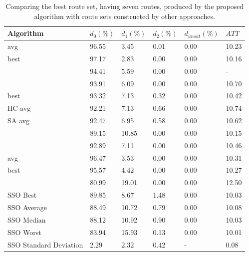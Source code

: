     \begin{table}[H]
    \centering
    \begin{tabular}{|l||l|l|l|l|l|}
    \hline
    Algorithm & $d_0(\%)$ & $d_1(\%)$ & $d_2(\%)$ & $d_{unsat}(\%)$ & $ATT$ \\
    \hline
    \citet{kechagiopoulos14} avg & 96.55 & 3.45 & 0.01 & 0.00 & 10.23 \\
    \citet{kechagiopoulos14} best & 97.17 & 2.83 & 0.00 & 0.00 & 10.16 \\
    \citet{nikolic14} & 94.41 & 5.59 & 0.00 & 0.00 & - \\
    \citet{kidwai98} & 93.91 & 6.09 & 0.00 & 0.00 & 10.70 \\
    \citet{fan10} best & 93.32 & 7.13 & 0.32 & 0.00 & 10.42  \\
    \citet{fan10} HC avg & 92.21 & 7.13 & 0.66 & 0.00 & 10.74 \\
    \citet{fan10} SA avg & 92.47 & 6.95 & 0.58 & 0.00 & 10.62 \\
    \citet{chakroborty02} & 89.15 & 10.85 & 0.00 & 0.00 & 10.15 \\
    \citet{zhang10} & 92.89 & 7.11 & 0.00 & 0.00 & 10.46 \\
    \citet{chew12} avg & 96.47 & 3.53 & 0.00 & 0.00 & 10.31 \\
    \citet{chew12} best & 95.57 & 4.42 & 0.00 & 0.00 & 10.27 \\
    \citet{baaj91} & 80.99 & 19.01 & 0.00 & 0.00 & 12.50 \\
    \hline
    \hline
    SSO Best & 89.85 & 8.67 & 1.48 & 0.00 & 10.03\\
    SSO Average & 88.49 & 10.72 & 0.79 & 0.00 & 10.08\\
    SSO Median & 88.12 & 10.92 & 0.90 & 0.00 & 10.03\\
    SSO Worst & 83.94 & 15.93 & 0.13 & 0.00 & 10.01\\
    SSO Standard Deviation & 2.29 & 2.32 & 0.42 & - & 0.08\\
    \hline
    \end{tabular}
    \caption {Comparing the best route set, having seven routes, produced by the proposed algorithm with route sets constructed by other approaches.}
    \label{table:performanceComparison_7}
    \end{table}
